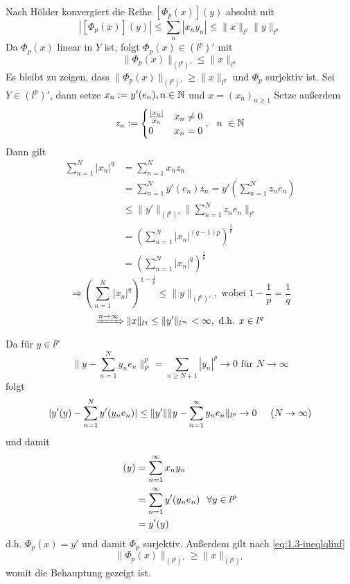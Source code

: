 \begin{beispiel}
	\begin{beweis}
		Nach Hölder konvergiert die Reihe $[\Phi_{p}(x)](y)$ absolut mit 
		\[ | [\Phi_{p}(x)](y) | \leq \sum_{n} |x_{n} y_{n}| \leq \| x \|_{l^{q}} \| y \|_{l^{p}} \]
		Da $\Phi_{p}(x)$ linear in $Y$ ist, folgt $\Phi_{p}(x) \in (l^{p})'$ mit
		\[ \| \Phi_{p}(x) \|_{(l^{p})'} \leq \| x \|_{l^{q}} \]
		Es bleibt zu zeigen, dass $ \| \Phi_{p}(x) \|_{(l^{p})'} \geq \| x \|_{l^{q}} $ und $\Phi_{p}$ surjektiv ist.
		Sei $Y \in (l^{p})'$, dann setze $x_{n} := y'(e_{n}), n \in \mathbb{N}$ und $x = (x_{n})_{n \geq 1}$
		Setze au{\ss}erdem
		\[ z_{n} := \begin{cases} \frac{|x_{n}|}{x_{n}} & x_{n} \neq 0 \\ 0 & x_{n} = 0 \end{cases}, \hspace{0.25cm} n \ \in \mathbb{N} \]
		Dann gilt
		\begin{align*}
			\sum_{n=1}^{N} |x_{n}|^{q} & = \sum_{n = 1}^{N} x_{n} z_{n} \\
			& = \sum_{n = 1}^{N} y'(e_{n}) z_{n} = y'\left(\sum_{n = 1}^{N} z_{n} e_{n} \right) \\
			& \leq \| y' \|_{(l^{p})'} \| \sum_{n = 1}^{N} z_{n} e_{n} \|_{l^{p}} \\
			& = \left( \sum_{n = 1}^{N} |x_{n}|^{(q - 1)p} \right)^{\frac{1}{p}} \\
			& = \left( \sum_{n = 1}^{N} |x_{n}|^{q}\right)^{\frac{1}{p}}
		\end{align*}
		\[ \Rightarrow \left( \sum_{n = 1}^{N} |x_{n}|^{q} \right)^{1-\frac{1}{p}} \leq \| y \|_{(l^{p})'}, \text{ wobei } 1 - \frac{1}{p} = \frac{1}{q} \]
		\[ \xRightarrow{n \rightarrow \infty} \| x \|_{l^{q}} \leq \| y' \|_{l^{\infty}} < \infty, \text{ d.h. } x \in
		l^{q} \label{eq:1.3-ineqlqlinf} \]
		Da für $y \in l^{p}$
		\[ \| y - \sum_{n = 1}^{N} y_{n} e_{n} \|_{l^{p}}^{p} = \sum_{n \geq N + 1} |y_{n}|^{p} \rightarrow 0 \text{ für } N \rightarrow \infty \]
		folgt
		\[ | y' (y) - \sum_{n = 1}^{N} y' ( y_{n} e_{n} ) | \leq \| y' \| \| y - \sum_{n = 1}^{\infty} y_{n} e_{n} \|_{l^{p}}  \rightarrow 0 \hspace{0.5cm} (N \rightarrow \infty) \]
		und damit \\
		\begin{align*}
			[ \Phi_{p} (x) ](y) & = \sum_{n = 1}^{\infty} x_{n} y_{n} \\
			& = \sum_{n = 1}^{\infty} y'(y_{n} e_{n}) \hspace{0.25cm} \forall y \in l^{p} \\
			& = y'(y)			
		\end{align*}
		d.h. $ \Phi_{p}(x) = y'$ und damit $\Phi_{p}$ surjektiv.
		Au{\ss}erdem gilt nach \eqref{eq:1.3-ineqlqlinf}
		\[ \| \Phi_{p}(x) \|_{(l^{p})'} \geq \| x \|_{(l^{q})'} \]
		womit die Behauptung gezeigt ist.
	\end{beweis}
\end{beispiel}


